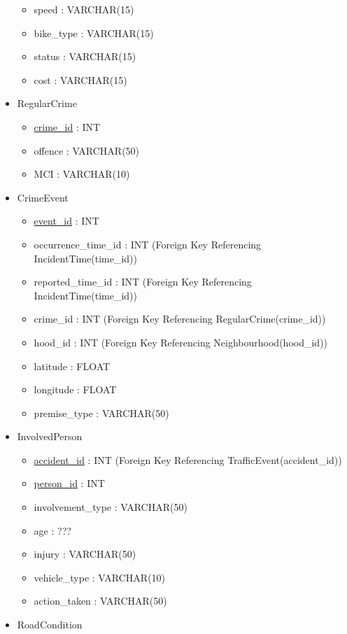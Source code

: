 \documentclass[12pt, a4paper]{article}
\begin{document}
\begin{itemize}
\begin{itemize}
        \item speed : VARCHAR(15)
        \item bike\_type : VARCHAR(15)
        \item status : VARCHAR(15)
        \item cost : VARCHAR(15)
    \end{itemize}
    \item RegularCrime
        \begin{itemize}
        \item \underline{crime\_id} : INT
        \item offence : VARCHAR(50)
        \item MCI : VARCHAR(10)
    \end{itemize}
    \item CrimeEvent
        \begin{itemize}
        \item \underline{event\_id} : INT
        \item occurrence\_time\_id : INT (Foreign Key Referencing IncidentTime(time\_id))
        \item reported\_time\_id : INT (Foreign Key Referencing IncidentTime(time\_id))
        \item crime\_id : INT (Foreign Key Referencing RegularCrime(crime\_id))
        \item hood\_id : INT (Foreign Key Referencing Neighbourhood(hood\_id))
        \item latitude : FLOAT
        \item longitude : FLOAT
        \item premise\_type : VARCHAR(50)
    \end{itemize}
    \item InvolvedPerson
    \begin{itemize}
        \item \underline{accident\_id} : INT (Foreign Key Referencing TrafficEvent(accident\_id))
        \item \underline{person\_id} : INT
        \item involvement\_type : VARCHAR(50)
        \item age : ???
        \item injury : VARCHAR(50)
        \item vehicle\_type : VARCHAR(10)
        \item action\_taken : VARCHAR(50)
    \end{itemize}
    \item RoadCondition

\end{itemize}
\end{document}
